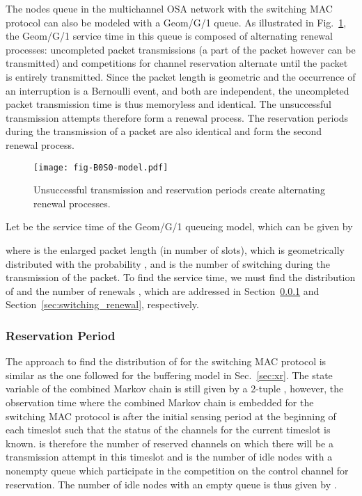 \documentclass[12pt,journal,oneside,onecolumn]{IEEEtran}
\begin{document}
The nodes queue in the multichannel OSA network with the switching MAC protocol can 
also be modeled with a Geom/G/1 queue. 
As illustrated in Fig.~\ref{fig-B0S0-model.pdf}, the Geom/G/1 service time in this queue is composed of alternating renewal processes: 
uncompleted packet transmissions (a part of the packet however can be transmitted) 
and competitions for channel reservation alternate until the packet is entirely transmitted. 
Since the packet length is geometric and the occurrence of an interruption is a Bernoulli event, and both are independent, the uncompleted packet transmission time is thus memoryless and identical. The unsuccessful transmission attempts therefore form a renewal process.
The reservation periods  during the transmission 
of a packet are also identical and form the second renewal process. 
\begin{figure}\texttt{[image: fig-B0S0-model.pdf]}\caption{Unsuccessful transmission and reservation periods create alternating renewal processes.}\label{fig-B0S0-model.pdf}\end{figure}
Let  be the service time of the Geom/G/1 queueing model, which can be given by

where  is the enlarged packet length (in number of slots), 
which is geometrically distributed with 
the probability , 
and  is the number of switching during the transmission 
of the packet. To find the service time, we must find the distribution of  and the number of renewals , 
which are addressed in Section~\ref{sec:switching_X_R} and Section~\ref{sec:switching_renewal}, respectively.

\subsubsection{Reservation Period}
\label{sec:switching_X_R}

The approach to find the distribution of  for the switching MAC protocol is similar as the one followed
for the buffering model in Sec.~\ref{sec:xr}.
The state variable of the combined Markov chain is still 
given by a 2-tuple , 
however,  the observation time where the combined Markov chain is 
embedded for the switching MAC protocol is after the 
initial sensing period at the beginning of each timeslot such that the status of the channels 
for the current timeslot is known. 
 is therefore the number of reserved channels
on which there will be a transmission attempt in this timeslot and  is the number
of idle nodes 
with a nonempty queue which participate in the competition on the control channel for reservation.
The number of idle nodes with an empty queue is thus given 
by . 
\end{document}
